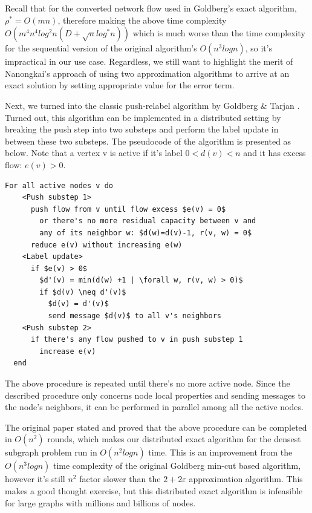 \documentclass{article}
\begin{document}
Recall that for the converted network flow used in Goldberg's exact algorithm, $\rho^* = O(mn)$, therefore making the above time complexity $O(m^4 n^4 log^2n (D + \sqrt{n} log^*n))$ which is much worse than the time complexity for the sequential version of the original algorithm's $O(n^3logn)$, so it's impractical in our use case. Regardless, we still want to highlight the merit of Nanongkai's approach of using two approximation algorithms to arrive at an exact solution by setting appropriate value for the error term.

Next, we turned into the classic push-relabel algorithm by Goldberg \& Tarjan \cite{Goldberg:1988:NAM:48014.61051}. Turned out, this algorithm can be implemented in a distributed setting by breaking the push step into two substeps and perform the label update in between these two substeps. The pseudocode of the algorithm is presented as below. Note that a vertex v is active if it's label $0 < d(v) < n$ and it has excess flow: $e(v) > 0$.

\begin{lstlisting}[mathescape=true]
  For all active nodes v do
    <Push substep 1>
      push flow from v until flow excess $e(v) = 0$
        or there's no more residual capacity between v and
        any of its neighbor w: $d(w)=d(v)-1, r(v, w) = 0$
      reduce e(v) without increasing e(w)
    <Label update>
      if $e(v) > 0$
        $d'(v) = min(d(w) +1 | \forall w, r(v, w) > 0)$
        if $d(v) \neq d'(v)$
          $d(v) = d'(v)$
          send message $d(v)$ to all v's neighbors
    <Push substep 2>
      if there's any flow pushed to v in push substep 1
        increase e(v)
  end
\end{lstlisting}

The above procedure is repeated until there's no more active node. Since the described procedure only concerns node local properties and sending messages to the node's neighbors, it can be performed in parallel among all the active nodes.

The original paper stated and proved that the above procedure can be completed in $O(n^2)$ rounds, which makes our distributed exact algorithm for the densest subgraph problem run in $O(n^2logn)$ time. This is an improvement from the $O(n^3logn)$ time complexity of the original Goldberg min-cut based algorithm, however it's still $n^2$ factor slower than the $2+2\varepsilon$ approximation algorithm. This makes a good thought exercise, but this distributed exact algorithm is infeasible for large graphs with millions and billions of nodes.
\end{document}
